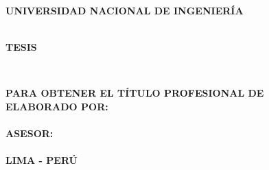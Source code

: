 \begin{titlepage}
	
	\begin{center}
		\vspace*{2 mm}
		{\LARGE \textbf{UNIVERSIDAD NACIONAL DE INGENIERÍA}}\\
		\vspace{5 mm}
		{\LARGE \textbf{\@facultad}}\\
		\vspace{6.5 mm}
		\begin{figure}[h]
			\centering 
			
		\end{figure}
		\vspace{1 mm}	
		{\Large \textbf{TESIS} }\\
		\vspace{5 mm}	
		
		\onehalfspacing  %
		{\Large \textbf{{\@titlecaratula}} }\\
		
		\singlespacing  %
		
		\vspace{5 mm}	
		{\large \textbf{PARA OBTENER EL TÍTULO PROFESIONAL DE {\@grado} } }\\
		\vspace{10 mm}
		{\large \textbf{ELABORADO POR:} }\\
		\vspace{5 mm}	
		{\large \textbf{\@authorcaratula} }\\
		\vspace{10 mm}
		{\large \textbf{ASESOR:} }\\
		\vspace{5 mm}	
		{\large \textbf{\@asesor} }\\
		\vspace{10 mm}	
		{\large \textbf{LIMA - PERÚ} }\\
		\vspace{5 mm}	
		{\large \textbf{\@yyearr} }\\

	\end{center}

\end{titlepage}